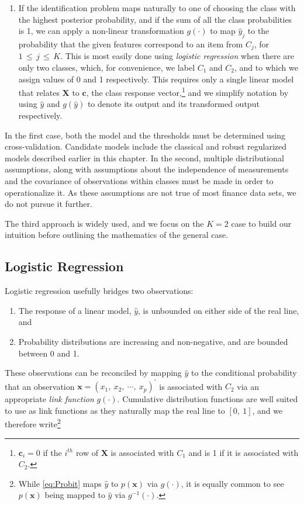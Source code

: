 \documentclass[graybox,envcountchap,sectrefs]{svmono}\usepackage[]{graphicx}\usepackage[]{xcolor}
\begin{document}
\begin{appendices}
\begin{enumerate}
\item If the identification problem maps naturally to one of choosing the
class with the highest posterior probability, and if the sum of all
the class probabilities is 1, we can apply a non-linear transformation
$g(\cdot)$ to map $\hat{y}_{j}$ to the probability that the given
features correspond to an item from $C_{j}$, for $1\,\leqslant\,j\,\leqslant\,K$.
This is most easily done using \emph{logistic regression} when there
are only two classes, which, for convenience, we label $C_{1}$ and
$C_{2}$, and to which we assign values of 0 and 1 respectively. This
requires only a single linear model that relates $\mathbf{X}$ to
$\mathbf{c}$, the class response vector,\footnote{$\mathbf{c}_{i}=0$ if the $i^{th}$ row of $\mathbf{X}$ is associated
with $C_{1}$ and is 1 if it is associated with $C_{2}$.} and we simplify notation by using $\hat{y}$ and $g\left(\hat{y}\right)$
to denote its output and its transformed output respectively.
\end{enumerate}
In the first case, both the model and the thresholds must be determined
using cross-validation. Candidate models include the classical and
robust regularized models described earlier in this chapter. In the
second, multiple distributional assumptions, along with assumptions
about the independence of measurements and the covariance of observations
within classes must be made in order to operationalize it. As these
assumptions are not true of most finance data sets, we do not pursue
it further.

The third approach is widely used, and we focus on the $K=2$ case
to build our intuition before outlining the mathematics of the general
case. 

\subsection{Logistic Regression}

Logistic regression usefully bridges two observations:
\begin{enumerate}
\item The response of a linear model, $\hat{y}$, is unbounded on either
side of the real line, and
\item Probability distributions are increasing and non-negative, and are
bounded between 0 and 1.
\end{enumerate}
These observations can be reconciled by mapping $\hat{y}$ to the
conditional probability that an observation $\mathbf{x}=\left(x_{1},\ x_{2},\ \cdots,\ x_{p}\right)^{\prime}$
is associated with $C_{2}$ via an appropriate \emph{link function}
$g\left(\cdot\right)$. Cumulative distribution functions are well
suited to use as link functions as they naturally map the real line
to $[0,\ 1]$, and we therefore write\footnote{While \ref{eq:Probit} maps $\hat{y}$ to $p\left(\mathbf{x}\right)$
via $g\left(\cdot\right)$, it is equally common to see $p\left(\mathbf{x}\right)$
being mapped to $\hat{y}$ via $g^{-1}\left(\cdot\right)$.} 


\end{appendices}
\end{document}

